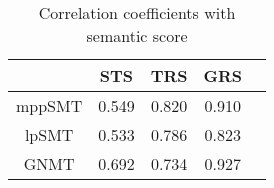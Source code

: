 
\begin{table}
\centering
\caption{Correlation coefficients with semantic score}
\begin{tabular}{|c|c|c|c|c|}
\hline
 & STS & TRS & GRS\\
\hline
mppSMT  & 0.549 & 0.820 & 0.910 \\
\hline
lpSMT  & 0.533 & 0.786 & 0.823 \\
\hline
GNMT & 0.692 & 0.734 & 0.927 \\
\hline
\end{tabular}
\label{table:correlation}
\end{table}


%

%


